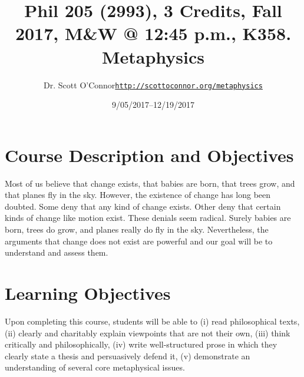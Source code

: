 \documentclass[article,oneside]{memoir}
\makeatletter
\def\myauthor{Author}
\def\mytitle{Title}
\def\mycopyright{\myauthor}
\def\myweb{\href{http://scottoconnor.org/metaphysics}{http://scottoconnor.org/metaphysics}}
\def\myauthor{Dr. Scott O'Connor}
\def\mytitle{{\normalsize Phil 205 (2993), 3 Credits, Fall 2017, M\&W @ 12:45 p.m., K358. \newline} \HUGE Metaphysics}
\makeatother
\begin{document}
\setsansfont[Mapping=tex-text]{Georgia} 
\setmonofont[Mapping=tex-text,Scale=0.8]{Georgia} 

\def\ind{\hangindent=1 true cm\hangafter=1 \noindent}
\def\labelitemi{$\cdot$}

\pagestyle{kjh}

\title{\LARGE\mytitle}     
\author{\Large\myauthor \newline \footnotesize\texttt{\noindent\myweb}}
\date{9/05/2017--12/19/2017}

\published{\,}

\maketitle




%
%

\section{Course Description and Objectives}

Most of us believe that change exists, that babies are born, that trees grow, and that planes fly in the sky. However, the existence of change has long been doubted. Some deny that any kind of change exists. Other deny that certain kinds of change like motion exist. These denials seem radical. Surely babies are born, trees do grow, and planes really do fly in the sky. Nevertheless, the arguments that change does not exist are powerful and our goal will be to understand and assess them. 


\section{Learning Objectives}

Upon completing this course, students will be able to (i) read
philosophical texts, (ii) clearly and charitably explain viewpoints that
are not their own, (iii) think critically and philosophically, (iv)
write well-structured prose in which they clearly state a thesis and
persuasively defend it, (v) demonstrate an understanding of several core
metaphysical issues.
\end{document}
